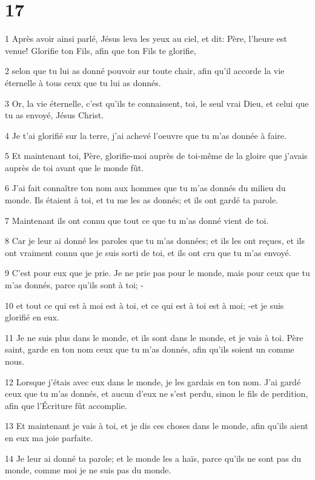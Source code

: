 \chapter{17}

\par 1 Après avoir ainsi parlé, Jésus leva les yeux au ciel, et dit: Père, l'heure est venue! Glorifie ton Fils, afin que ton Fils te glorifie,
\par 2 selon que tu lui as donné pouvoir sur toute chair, afin qu'il accorde la vie éternelle à tous ceux que tu lui as donnés.
\par 3 Or, la vie éternelle, c'est qu'ils te connaissent, toi, le seul vrai Dieu, et celui que tu as envoyé, Jésus Christ.
\par 4 Je t'ai glorifié sur la terre, j'ai achevé l'oeuvre que tu m'as donnée à faire.
\par 5 Et maintenant toi, Père, glorifie-moi auprès de toi-même de la gloire que j'avais auprès de toi avant que le monde fût.
\par 6 J'ai fait connaître ton nom aux hommes que tu m'as donnés du milieu du monde. Ils étaient à toi, et tu me les as donnés; et ils ont gardé ta parole.
\par 7 Maintenant ils ont connu que tout ce que tu m'as donné vient de toi.
\par 8 Car je leur ai donné les paroles que tu m'as données; et ils les ont reçues, et ils ont vraiment connu que je suis sorti de toi, et ils ont cru que tu m'as envoyé.
\par 9 C'est pour eux que je prie. Je ne prie pas pour le monde, mais pour ceux que tu m'as donnés, parce qu'ils sont à toi; -
\par 10 et tout ce qui est à moi est à toi, et ce qui est à toi est à moi; -et je suis glorifié en eux.
\par 11 Je ne suis plus dans le monde, et ils sont dans le monde, et je vais à toi. Père saint, garde en ton nom ceux que tu m'as donnés, afin qu'ils soient un comme nous.
\par 12 Lorsque j'étais avec eux dans le monde, je les gardais en ton nom. J'ai gardé ceux que tu m'as donnés, et aucun d'eux ne s'est perdu, sinon le fils de perdition, afin que l'Écriture fût accomplie.
\par 13 Et maintenant je vais à toi, et je dis ces choses dans le monde, afin qu'ils aient en eux ma joie parfaite.
\par 14 Je leur ai donné ta parole; et le monde les a haïs, parce qu'ils ne sont pas du monde, comme moi je ne suis pas du monde.
